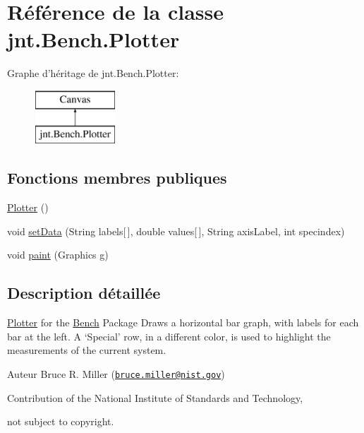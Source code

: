 \hypertarget{classjnt_1_1Bench_1_1Plotter}{\section{Référence de la classe jnt.\-Bench.\-Plotter}
\label{classjnt_1_1Bench_1_1Plotter}
}
Graphe d'héritage de jnt.\-Bench.\-Plotter\-:\begin{figure}[H]
\begin{center}
\leavevmode
\includegraphics[height=2.000000cm]{da/d70/classjnt_1_1Bench_1_1Plotter}
\end{center}
\end{figure}
\subsection*{Fonctions membres publiques}
\begin{DoxyCompactItemize}
\item 
\hyperlink{classjnt_1_1Bench_1_1Plotter_aee05d05068e7384db48ca46263de6c0c}{Plotter} ()
\item 
void \hyperlink{classjnt_1_1Bench_1_1Plotter_a4da83c587691e9498053c2429f3fac56}{set\-Data} (String labels\mbox{[}$\,$\mbox{]}, double values\mbox{[}$\,$\mbox{]}, String axis\-Label, int specindex)
\item 
void \hyperlink{classjnt_1_1Bench_1_1Plotter_abff7e85d683ad0c694eb9deea523292e}{paint} (Graphics g)
\end{DoxyCompactItemize}


\subsection{Description détaillée}
\hyperlink{classjnt_1_1Bench_1_1Plotter}{Plotter} for the \hyperlink{classjnt_1_1Bench_1_1Bench}{Bench} Package Draws a horizontal bar graph, with labels for each bar at the left. A `\-Special' row, in a different color, is used to highlight the measurements of the current system.

\begin{DoxyAuthor}{Auteur}
Bruce R. Miller (\href{mailto:bruce.miller@nist.gov}{\tt bruce.\-miller@nist.\-gov}) 

Contribution of the National Institute of Standards and Technology, 

not subject to copyright. 
\end{DoxyAuthor}


